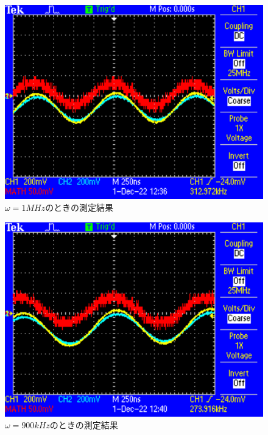 \begin{figure}[H]
    \centering
    \includegraphics[scale=0.5]{F0001.pdf}
    \caption{$\omega=1\si{MHz}$のときの測定結果}
\end{figure}

\begin{figure}[H]
    \centering
    \includegraphics[scale=0.5]{F0002.pdf}
    \caption{$\omega=900\si{kHz}$のときの測定結果}
\end{figure}

